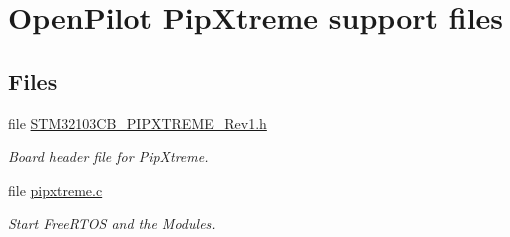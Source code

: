 \hypertarget{group___pip_xtreme}{\section{\-Open\-Pilot \-Pip\-Xtreme support files}
\label{group___pip_xtreme}
}
\subsection*{\-Files}
\begin{DoxyCompactItemize}
\item 
file \hyperlink{_s_t_m32103_c_b___p_i_p_x_t_r_e_m_e___rev1_8h}{\-S\-T\-M32103\-C\-B\-\_\-\-P\-I\-P\-X\-T\-R\-E\-M\-E\-\_\-\-Rev1.\-h}
\begin{DoxyCompactList}\small\item\em \-Board header file for \-Pip\-Xtreme. \end{DoxyCompactList}\item 
file \hyperlink{pipxtreme_8c}{pipxtreme.\-c}
\begin{DoxyCompactList}\small\item\em \-Start \-Free\-R\-T\-O\-S and the \-Modules. \end{DoxyCompactList}\end{DoxyCompactItemize}
